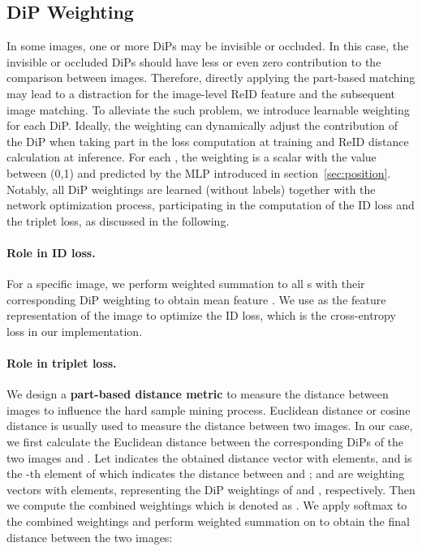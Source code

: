 \documentclass[10pt,twocolumn,letterpaper]{article}
\begin{document}
\subsection{DiP Weighting}
\label{sec:weight}
In some images, one or more DiPs may be invisible or occluded. In this case, the invisible or occluded DiPs should have less or even zero contribution to the comparison between images.
Therefore, directly applying the part-based matching may lead to a distraction for the image-level ReID feature and the subsequent image matching. To alleviate the such problem, we introduce learnable weighting for each DiP.
Ideally, the weighting can dynamically adjust the contribution of the DiP when taking part in the loss computation at training and ReID distance calculation at inference. For each , the weighting  is a scalar with the value between (0,1) and predicted by the MLP introduced in section~\ref{sec:position}. 
Notably, all DiP weightings are learned (without labels) together with the network optimization process, participating in the computation of the ID loss\cite{zheng2017discriminatively} and the triplet loss\cite{liu2017end}, as discussed in the following.

\vspace{-0.4cm}
\paragraph{Role in ID loss.} For a specific image, we perform weighted summation to all s with their corresponding DiP weighting  to obtain mean feature . We use  as the feature representation of the image to optimize the ID loss, which is the cross-entropy loss in our implementation.

\vspace{-0.4cm}
\paragraph{Role in triplet loss.} We design a \textbf{part-based distance metric} to measure the distance between images to influence the hard sample mining process. Euclidean distance or cosine distance is usually used to measure the distance between two images. In our case, we first calculate the Euclidean distance between the corresponding DiPs of the two images  and . Let  indicates the obtained distance vector with  elements, and  is the -th element of  which indicates the distance between  and ;  and  are weighting vectors with  elements, representing the DiP weightings of  and , respectively. Then we compute the combined weightings which is denoted as . We apply softmax to the combined weightings  and perform weighted summation on  to obtain the final distance between the two images:
\end{document}
